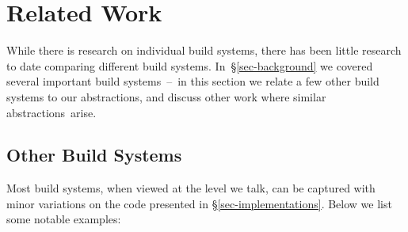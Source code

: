 \section{Related Work}\label{sec-related}

While there is research on individual build systems, there has been little
research to date comparing different build systems. In~\S\ref{sec-background} we
covered several important build systems~--~in this section we relate a few
other build systems to our abstractions, and discuss other work where similar
abstractions~arise.

\subsection{Other Build Systems}\label{sec-related-build}

Most build systems, when viewed at the level we talk, can be captured with minor
variations on the code presented in \S\ref{sec-implementations}. Below we list
some notable examples:

